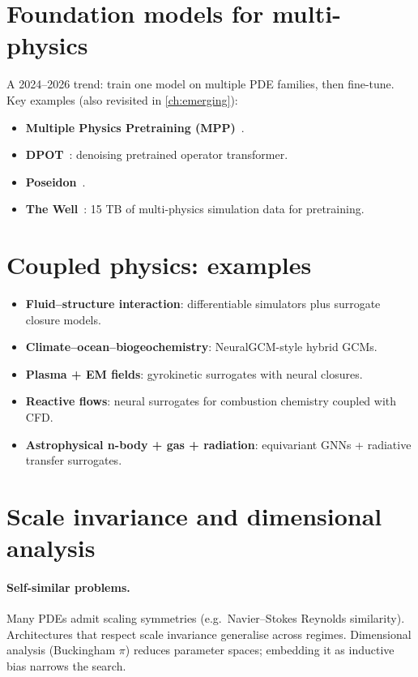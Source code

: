 \section{Foundation models for multi-physics}
A 2024--2026 trend: train one model on multiple PDE families, then
fine-tune. Key examples (also revisited in \cref{ch:emerging}):
\begin{itemize}
\item \textbf{Multiple Physics Pretraining (MPP)}~\cite{mccabe2024mpp}.
\item \textbf{DPOT}~\cite{hao2024dpot}: denoising pretrained operator
transformer.
\item \textbf{Poseidon}~\cite{herde2024poseidon}.
\item \textbf{The Well}~\cite{ohana2024well}: 15 TB of multi-physics
simulation data for pretraining.
\end{itemize}

\section{Coupled physics: examples}
\begin{itemize}
\item \textbf{Fluid--structure interaction}: differentiable simulators
plus surrogate closure models.
\item \textbf{Climate--ocean--biogeochemistry}: NeuralGCM-style hybrid
GCMs.
\item \textbf{Plasma + EM fields}: gyrokinetic surrogates with neural
closures.
\item \textbf{Reactive flows}: neural surrogates for combustion
chemistry coupled with CFD.
\item \textbf{Astrophysical n-body + gas + radiation}: equivariant
GNNs + radiative transfer surrogates.
\end{itemize}

\section{Scale invariance and dimensional analysis}
\paragraph{Self-similar problems.}
Many PDEs admit scaling symmetries (e.g.\ Navier--Stokes Reynolds
similarity). Architectures that respect scale invariance generalise
across regimes. Dimensional analysis (Buckingham $\pi$) reduces
parameter spaces; embedding it as inductive bias narrows the search.

